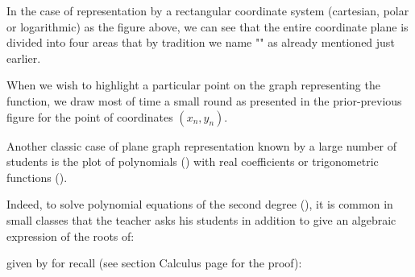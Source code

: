 	In the case of representation by a rectangular coordinate system (cartesian, polar or logarithmic) as the figure above, we can see that the entire coordinate plane is divided into four areas that by tradition we name "" as already mentioned just earlier.

	\begin{tcolorbox}[title=Remark,arc=10pt,breakable,drop lifted shadow,
  skin=enhanced,
  skin first is subskin of={enhancedfirst}{arc=10pt,no shadow},
  skin middle is subskin of={enhancedmiddle}{arc=10pt,no shadow},
  skin last is subskin of={enhancedlast}{drop lifted shadow}]
	When we wish to highlight a particular point on the graph representing the function, we draw most of time a small round as presented in the prior-previous figure for the point of coordinates $(x_n,y_n)$.
	\end{tcolorbox}	

	Another classic case of plane graph representation known by a large number of students is the plot of polynomials () with real coefficients or trigonometric functions ().

	Indeed, to solve polynomial equations of the second degree (), it is common in small classes that the teacher asks his students in addition to give an algebraic expression of the roots of:
	
	given by for recall (see section Calculus page \pageref{double root} for the proof):
	
